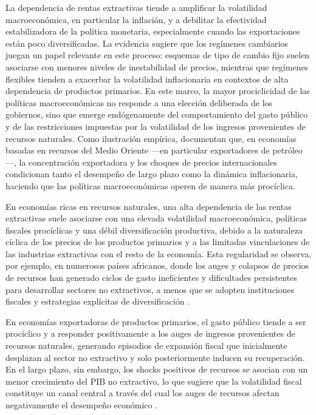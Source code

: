 \documentclass[../../PTFM.tex]{subfiles}
\begin{document}
	La dependencia de rentas extractivas tiende a amplificar la volatilidad macroeconómica, en particular la inflación, y a debilitar la efectividad estabilizadora de la política monetaria, especialmente cuando las exportaciones están poco diversificadas. La evidencia sugiere que los regímenes cambiarios juegan un papel relevante en este proceso: esquemas de tipo de cambio fijo suelen asociarse con menores niveles de inestabilidad de precios, mientras que regímenes flexibles tienden a exacerbar la volatilidad inflacionaria en contextos de alta dependencia de productos primarios. En este marco, la mayor prociclicidad de las políticas macroeconómicas no responde a una elección deliberada de los gobiernos, sino que emerge endógenamente del comportamiento del gasto público y de las restricciones impuestas por la volatilidad de los ingresos provenientes de recursos naturales. Como ilustración empírica, \textcite{Kamar2017} documentan que, en economías basadas en recursos del Medio Oriente —en particular exportadores de petróleo—, la concentración exportadora y los choques de precios internacionales condicionan tanto el desempeño de largo plazo como la dinámica inflacionaria, haciendo que las políticas macroeconómicas operen de manera más procíclica.
	
	En economías ricas en recursos naturales, una alta dependencia de las rentas extractivas suele asociarse con una elevada volatilidad macroeconómica, políticas fiscales procíclicas y una débil diversificación productiva, debido a la naturaleza cíclica de los precios de los productos primarios y a las limitadas vinculaciones de las industrias extractivas con el resto de la economía. Esta regularidad se observa, por ejemplo, en numerosos países africanos, donde los auges y colapsos de precios de recursos han generado ciclos de gasto ineficientes y dificultades persistentes para desarrollar sectores no extractivos, a menos que se adopten instituciones fiscales y estrategias explícitas de diversificación \parencite{Bond2014}.
	
	En economías exportadoras de productos primarios, el gasto público tiende a ser procíclico y a responder positivamente a los auges de ingresos provenientes de recursos naturales, generando episodios de expansión fiscal que inicialmente desplazan al sector no extractivo y solo posteriormente inducen su recuperación. En el largo plazo, sin embargo, los shocks positivos de recursos se asocian con un menor crecimiento del PIB no extractivo, lo que sugiere que la volatilidad fiscal constituye un canal central a través del cual los auges de recursos afectan negativamente el desempeño económico \parencite{Arezki2012}.
	
\end{document}
